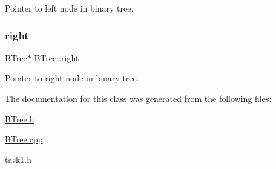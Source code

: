 Pointer to left node in binary tree. 

\mbox{\label{classBTree_af95770a535a9278b37fd73d7b6ae7f5e}} 
\subsubsection{\texorpdfstring{right}{right}}
{\footnotesize\ttfamily \mbox{\hyperlink{classBTree}{B\+Tree}}$\ast$ B\+Tree\+::right}



Pointer to right node in binary tree. 



The documentation for this class was generated from the following files\+:\begin{DoxyCompactItemize}
\item 
\mbox{\hyperlink{BTree_8h}{B\+Tree.\+h}}\item 
\mbox{\hyperlink{BTree_8cpp}{B\+Tree.\+cpp}}\item 
\mbox{\hyperlink{task1_8h}{task1.\+h}}\end{DoxyCompactItemize}
